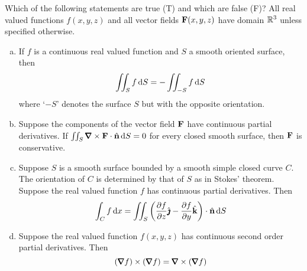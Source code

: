 \begin{question}[M317 2009A] %
Which of the following statements are true (T) and which are false (F)? 
All real valued functions $f(x,y,z)$
and all vector fields $\mathbf{F}(x, y, z)$ have domain $\mathbb{R}^3$ unless 
specified otherwise.




\begin{enumerate}[(a)]
\item
If $f$ is a continuous real valued function and $S$ a smooth oriented 
surface, then
\begin{equation*}
\iint_S f\, \mathrm{d}S = -\iint_{-S} f\,\mathrm{d}S
\end{equation*}
where `$-S$' denotes the surface $S$ but with the opposite orientation.

\item
Suppose the components of the vector field $\mathbf{F}$ have continuous 
partial derivatives. If $\dblInt_S\vnabla\times\vF\cdot\hn\,\dee{S}=0$
for every closed smooth surface, then $\mathbf{F}$ is conservative.

\item
Suppose $S$ is a smooth surface bounded by a smooth simple closed curve $C$. 
The orientation of $C$ is determined by that of $S$ as in Stokes' theorem. 
Suppose the real valued function $f$ has continuous partial derivatives. Then
\begin{equation*}
\int_C f\,\mathrm{d}x
=\iint_S \left(\frac{\partial f}{\partial z}\hat{\pmb{\jmath}}
          - \frac{\partial f}{\partial y}\hat{\mathbf{k}}\right)\cdot\hat{\mathbf{n}}\,\mathrm{d}S
\end{equation*}

\item
Suppose the real valued function $f(x,y,z)$ has continuous second order 
partial derivatives. Then
\begin{equation*}
(\vnabla f ) \times (\vnabla f ) = \vnabla  \times (\vnabla f )
\end{equation*}


\end{enumerate}
\end{question}
